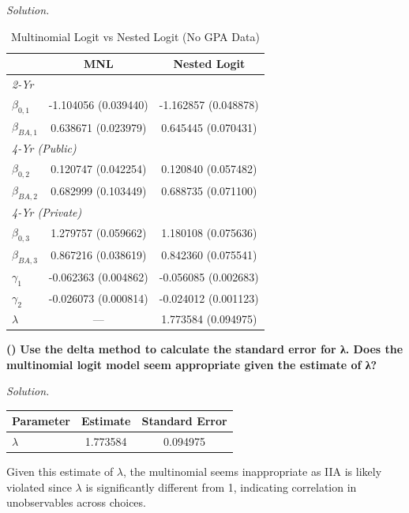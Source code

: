 \documentclass[11pt]{article}
\newcounter{q}
\newcounter{subq}[q]
\renewcommand{\thesubq}{\alph{subq}}
\newcommand{\subquestion}[1]{%
  \refstepcounter{subq}
  \vspace{0.35em}
  \noindent\textbf{(\thesubq)} \textbf{#1}\par
}
\newenvironment{solution}{%
  \vspace{0.15em}
  \noindent\textit{Solution. }\ignorespaces
}{\vspace{0.5em}\par}
\newcommand{\1}{\mathbf{1}}
\begin{document}
\begin{solution}
  \begin{table}[htbp]
  \centering
    \caption{Multinomial Logit vs Nested Logit (No GPA Data)}
    \begin{tabular}{lcc}
      \hline
      & MNL & Nested Logit \\
      \hline
      \multicolumn{3}{l}{\textit{2-Yr}} \\
   $\beta_{0,1}$    & -1.104056 (0.039440) & -1.162857 (0.048878) \\
      $\beta_{BA,1}$   &  0.638671 (0.023979) &  0.645445 (0.070431) \\

      \multicolumn{3}{l}{\textit{4-Yr (Public)}} \\
      $\beta_{0,2}$    &  0.120747 (0.042254) &  0.120840 (0.057482) \\
      $\beta_{BA,2}$   &  0.682999 (0.103449) &  0.688735 (0.071100) \\

      \multicolumn{3}{l}{\textit{4-Yr (Private)}} \\
      $\beta_{0,3}$    &  1.279757 (0.059662) &  1.180108 (0.075636) \\
      $\beta_{BA,3}$   &  0.867216 (0.038619) &  0.842360 (0.075541) \\

      \hline
      $\gamma_1$       & -0.062363 (0.004862) & -0.056085 (0.002683) \\
      $\gamma_2$       & -0.026073 (0.000814) & -0.024012 (0.001123) \\
      $\lambda$        & ---                  &  1.773584 (0.094975) \\
      \hline
    \end{tabular}
  \end{table}
\end{solution}

\subquestion{Use the delta method to calculate the standard error for λ. Does the multinomial logit model
seem appropriate given the estimate of λ?}

\begin{solution}
  \centering
  \caption{Delta Method Standard Error for λ}

  \begin{tabular}{lcc}
  \hline
  Parameter & Estimate & Standard Error \\
  \hline
    $\lambda$ & 1.773584 & 0.094975 \\
  \hline
  \end{tabular}

  Given this estimate of $\lambda$, the multinomial seems inappropriate as IIA is likely violated since $\lambda$ is significantly different from 1, indicating correlation 
  in unobservables across choices.
\end{solution}
\end{document}

